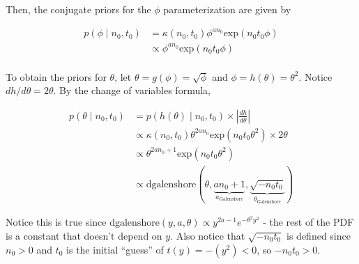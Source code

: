 \documentclass[]{article}
\begin{document}
Then, the conjugate priors for the \(\phi\) parameterization are given
by

\begin{align}
p(\phi \mid n_0, t_0) &= \kappa (n_0, t_0) \phi^{a n_0} \text{exp}(n_0 t_0 \phi) \\
&\propto \phi^{a n_0} \text{exp}(n_0 t_0 \phi) \\
\end{align}

To obtain the priors for \(\theta\), let
\(\theta = g(\phi) = \sqrt{\phi}\) and \(\phi = h(\theta) = \theta^2\).
Notice \(dh/d\theta = 2\theta\). By the change of variables formula,

\begin{align}
p(\theta \mid n_0, t_0) &= p(h(\theta) \mid n_0, t_0) \times \left| \frac{dh}{d\theta} \right| \\
&\propto \kappa(n_0, t_0) \theta^{2a n_0} \text{exp}\left( n_0 t_0 \theta^2 \right) \times 2 \theta \\
&\propto \theta^{2a n_0 + 1} \text{exp}\left( n_0 t_0 \theta^2 \right) \\
&\propto \text{dgalenshore}\left(\theta, \underbrace{a n_0 + 1}_{a_{\text{Galenshore}}}, \underbrace{\sqrt{-n_0 t_0}}_{\theta_{\text{Galenshore}}} \right)
\end{align}

Notice this is true since
\(\text{dgalenshore}(y, a, \theta) \propto y^{2a - 1} e^{- \theta^2 y^2}\)
- the rest of the PDF is a constant that doesn't depend on \(y\). Also
notice that \(\sqrt{-n_0 t_0}\) is defined since \(n_0 > 0\) and \(t_0\)
is the initial ``guess'' of \(t(y) = - (y^2) < 0\), so \(-n_0 t_0 > 0\).
\end{document}
